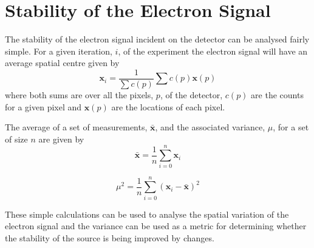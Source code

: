 \section{Stability of the Electron Signal}

The stability of the electron signal incident on the detector can be analysed fairly simple. For a given iteration, $i$, of the experiment the electron signal will have an average spatial centre given by
\begin{equation}\label{eq:weight_average_spatial}
\boldsymbol{x}_i = \frac{1}{\sum c(p)} \sum c(p) \boldsymbol x(p)
\end{equation}
where both sums are over all the pixels, $p$, of the detector, $c(p)$ are the counts for a given pixel and $\boldsymbol x(p)$ are the locations of each pixel.

The average of a set of measurements, $\bar{\boldsymbol{x}}$, and the associated variance, $\mu$, for a set of size $n$ are given by
\begin{equation}\label{eq:average_spatial}
\bar{\boldsymbol{x}} = \frac{1}{n} \sum_{i=0}^{n} \boldsymbol{x}_i
\end{equation}

\begin{equation}\label{eq:variance}
\mu^2 = \frac{1}{n} \sum_{i=0}^{n} (\boldsymbol{x}_i - \bar{\boldsymbol{x}})^2
\end{equation}

These simple calculations can be used to analyse the spatial variation of the electron signal and the variance can be used as a metric for determining whether the stability of the source is being improved by changes.
